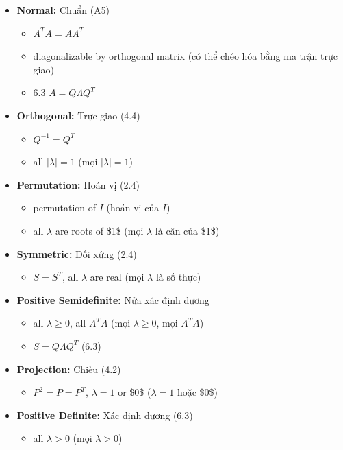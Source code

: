 \begin{itemize}
\begin{itemize}
  \item Diagonalize (Chéo hóa)
  \item $A = XJX^{-1}$ (A7), $J =$ Jordan form ($J =$ dạng Jordan)
\end{itemize}
  \item \textbf{Normal:} Chuẩn (A5)
\begin{itemize}
  \item $A^T A = A A^T$
  \item diagonalizable by orthogonal matrix (có thể chéo hóa bằng ma trận trực giao)
  \item 6.3 $A = Q\Lambda Q^T$
\end{itemize}
  \item \textbf{Orthogonal:} Trực giao (4.4)
\begin{itemize}
  \item $Q^{-1} = Q^T$
  \item all $|\lambda| = 1$ (mọi $|\lambda| = 1$)
\end{itemize}
  \item \textbf{Permutation:} Hoán vị (2.4)
\begin{itemize}
  \item permutation of $I$ (hoán vị của $I$)
  \item all $\lambda$ are roots of \$1\$ (mọi $\lambda$ là căn của \$1\$)
\end{itemize}
  \item \textbf{Symmetric:} Đối xứng (2.4)
\begin{itemize}
  \item $S = S^T$, all $\lambda$ are real (mọi $\lambda$ là số thực)
\end{itemize}
  \item \textbf{Positive Semidefinite:} Nửa xác định dương
\begin{itemize}
  \item all $\lambda \ge 0$, all $A^T A$ (mọi $\lambda \ge 0$, mọi $A^T A$)
  \item $S = Q\Lambda Q^T$ (6.3)
\end{itemize}
  \item \textbf{Projection:} Chiếu (4.2)
\begin{itemize}
  \item $P^2 = P = P^T$, $\lambda = 1$ or \$0\$ ($\lambda = 1$ hoặc \$0\$)
\end{itemize}
  \item \textbf{Positive Definite:} Xác định dương (6.3)
\begin{itemize}
  \item all $\lambda > 0$ (mọi $\lambda > 0$)

\end{itemize}
\end{itemize}

